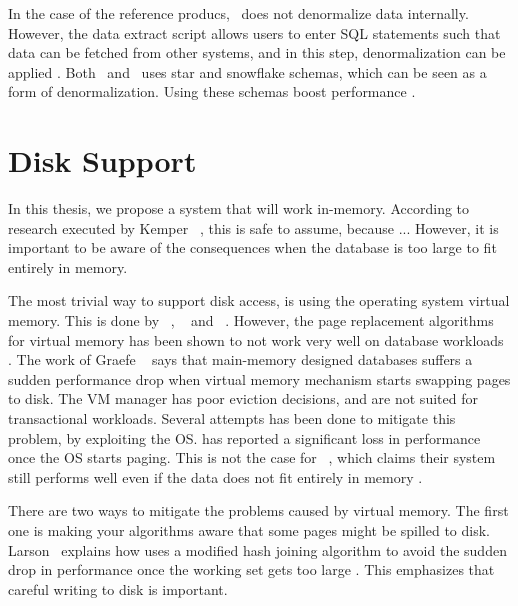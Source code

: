 In the case of the reference producs, \qlikview~does not denormalize data internally. However, the data extract script allows users to enter SQL statements such that data can be fetched from other systems, and in this step, denormalization can be applied \cite{Qlik2011-yc}. Both \qlikview~and \tableau~uses star and snowflake schemas, which can be seen as a form of denormalization. Using these schemas boost performance \cite{Kamkolkar2015-iq}.


\section{Disk Support}
\label{sec:Disk Support}
In this thesis, we propose a system that will work in-memory. According to research executed by Kemper \ea~\cite{Kemper2011-ap}, this is safe to assume, because ... However, it is important to be aware of the consequences when the database is too large to fit entirely in memory.

The most trivial way to support disk access, is using the operating system virtual memory. This is done by \monetdb~\cite{Boncz2002-yj}, \blink~\cite{Barber2014-ey} and \qlikview~\cite{Qlik2011-ef}. However, the page replacement algorithms for virtual memory has been shown to not work very well on database workloads . The work of Graefe \ea~\cite{Graefe2014-ds} says that main-memory designed databases suffers a sudden performance drop when virtual memory mechanism starts swapping pages to disk. The VM manager has poor eviction decisions, and are not suited for transactional workloads. Several attempts has been done to mitigate this problem, by exploiting the OS. \qlikview has reported a significant loss in performance once the OS starts paging. This is not the case for \tableau~, which claims their system still performs well even if the data does not fit entirely in memory \cite{Kamkolkar2015-iq}.

There are two ways to mitigate the problems caused by virtual memory. The first one is making your algorithms aware that some pages might be spilled to disk. Larson \ea~explains how \mssql uses a modified hash joining algorithm to avoid the sudden drop in performance once the working set gets too large \cite{Larson2013-mc}. This emphasizes that careful writing to disk is important.

